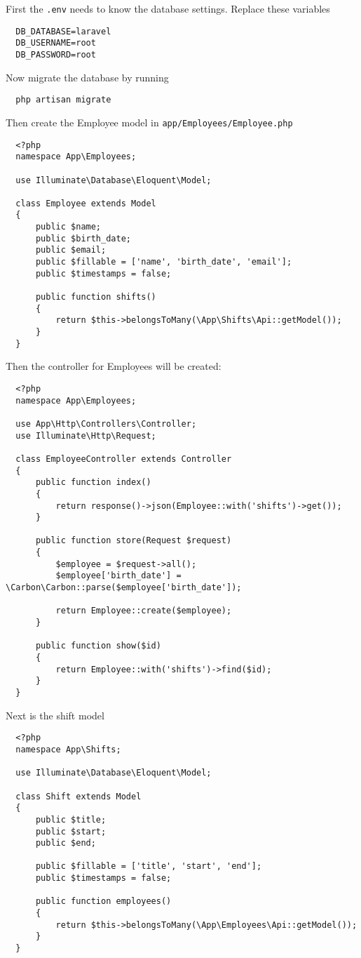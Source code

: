 First the \texttt{.env} needs to know the database settings. Replace these variables
\begin{verbatim}
  DB_DATABASE=laravel
  DB_USERNAME=root
  DB_PASSWORD=root
\end{verbatim}

Now migrate the database by running
\begin{verbatim}
  php artisan migrate
\end{verbatim}

Then create the Employee model in \texttt{app/Employees/Employee.php}
\begin{verbatim}
  <?php
  namespace App\Employees;

  use Illuminate\Database\Eloquent\Model;

  class Employee extends Model
  {
      public $name;
      public $birth_date;
      public $email;
      public $fillable = ['name', 'birth_date', 'email'];
      public $timestamps = false;

      public function shifts()
      {
          return $this->belongsToMany(\App\Shifts\Api::getModel());
      }
  }
\end{verbatim}

Then the controller for Employees will be created:
\begin{verbatim}
  <?php
  namespace App\Employees;

  use App\Http\Controllers\Controller;
  use Illuminate\Http\Request;

  class EmployeeController extends Controller
  {
      public function index()
      {
          return response()->json(Employee::with('shifts')->get());
      }

      public function store(Request $request)
      {
          $employee = $request->all();
          $employee['birth_date'] = \Carbon\Carbon::parse($employee['birth_date']);

          return Employee::create($employee);
      }

      public function show($id)
      {
          return Employee::with('shifts')->find($id);
      }
  }
\end{verbatim}

Next is the shift model
\begin{verbatim}
  <?php
  namespace App\Shifts;

  use Illuminate\Database\Eloquent\Model;

  class Shift extends Model
  {
      public $title;
      public $start;
      public $end;

      public $fillable = ['title', 'start', 'end'];
      public $timestamps = false;

      public function employees()
      {
          return $this->belongsToMany(\App\Employees\Api::getModel());
      }
  }
\end{verbatim}

